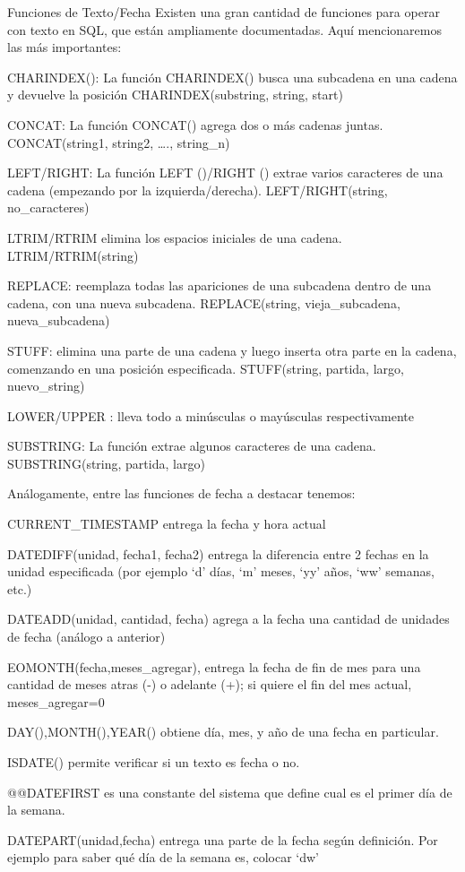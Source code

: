 \begin{frame}{Funciones de Texto/Fecha}
\protect\hypertarget{funciones-de-textofecha}{}
Existen una gran cantidad de funciones para operar con texto en SQL, que
están ampliamente documentadas. Aquí mencionaremos las más importantes:

CHARINDEX(): La función CHARINDEX() busca una subcadena en una cadena y
devuelve la posición CHARINDEX(substring, string, start)

CONCAT: La función CONCAT() agrega dos o más cadenas juntas.
CONCAT(string1, string2, \ldots., string\_n)

LEFT/RIGHT: La función LEFT ()/RIGHT () extrae varios caracteres de una
cadena (empezando por la izquierda/derecha). LEFT/RIGHT(string,
no\_caracteres)

LTRIM/RTRIM elimina los espacios iniciales de una cadena.
LTRIM/RTRIM(string)

REPLACE: reemplaza todas las apariciones de una subcadena dentro de una
cadena, con una nueva subcadena. REPLACE(string, vieja\_subcadena,
nueva\_subcadena)

STUFF: elimina una parte de una cadena y luego inserta otra parte en la
cadena, comenzando en una posición especificada. STUFF(string, partida,
largo, nuevo\_string)

LOWER/UPPER : lleva todo a minúsculas o mayúsculas respectivamente

SUBSTRING: La función extrae algunos caracteres de una cadena.
SUBSTRING(string, partida, largo)

Análogamente, entre las funciones de fecha a destacar tenemos:

CURRENT\_TIMESTAMP entrega la fecha y hora actual

DATEDIFF(unidad, fecha1, fecha2) entrega la diferencia entre 2 fechas en
la unidad especificada (por ejemplo `d' días, `m' meses, `yy' años, `ww'
semanas, etc.)

DATEADD(unidad, cantidad, fecha) agrega a la fecha una cantidad de
unidades de fecha (análogo a anterior)

EOMONTH(fecha,meses\_agregar), entrega la fecha de fin de mes para una
cantidad de meses atras (-) o adelante (+); si quiere el fin del mes
actual, meses\_agregar=0

DAY(),MONTH(),YEAR() obtiene día, mes, y año de una fecha en particular.

ISDATE() permite verificar si un texto es fecha o no.

@@DATEFIRST es una constante del sistema que define cual es el primer
día de la semana.

DATEPART(unidad,fecha) entrega una parte de la fecha según definición.
Por ejemplo para saber qué día de la semana es, colocar `dw'
\end{frame}
